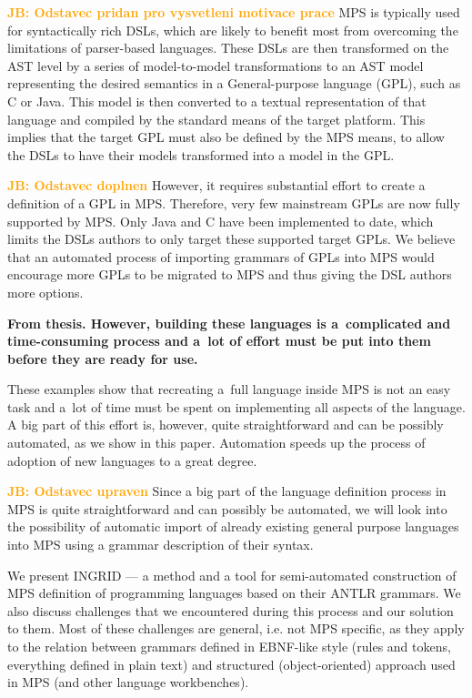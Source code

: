 \documentclass[10pt]{sigplanconf}
\newcommand{\todo}[1]{{\bfseries #1}}
\newcommand{\JB}[1]{\textcolor{orange}{\bfseries JB: #1}} %
\begin{document}
\JB{Odstavec pridan pro vysvetleni motivace prace} MPS is typically used for syntactically rich DSLs, which are likely to benefit most from overcoming the limitations of parser-based languages. These DSLs are then transformed on the AST level by a series of model-to-model transformations to an AST model representing the desired semantics in a General-purpose language (GPL), such as C or Java. This model is then converted to a textual representation of that language and compiled by the standard means of the target platform. This implies that the target GPL must also be defined by the MPS means, to allow the DSLs to have their models transformed into a model in the GPL.

\JB{Odstavec doplnen} However, it requires substantial effort to create a definition of a GPL in MPS. Therefore, very few mainstream GPLs are now fully supported by MPS. Only Java and C have been implemented to date, which limits the DSLs authors to only target these supported target GPLs. We believe that an automated process of importing grammars of GPLs into MPS would encourage more GPLs to be migrated to MPS and thus giving the DSL authors more options.

\todo{From thesis.
	However, building these languages is a~complicated and time-consuming process and a~lot of effort must be put into them before they are ready for use.

	These examples show that recreating a~full language inside MPS is not an easy task and a~lot of time must be spent on implementing all aspects of the language.
	A big part of this effort is, however, quite straightforward and can be possibly automated, as we show in this paper. Automation speeds up the process of adoption of new languages to a great degree.
}

\JB{Odstavec upraven} Since a big part of the language definition process in MPS is quite straightforward and can possibly be automated, we will look into the possibility of automatic import of already existing general purpose languages into MPS using a grammar description of their syntax.

We present INGRID --- a method and a tool for semi-automated construction of MPS definition of programming languages based on their ANTLR grammars.
We also discuss challenges that we encountered during this process and our solution to them. Most of these challenges are general, i.e. not MPS specific, as they apply to the relation between grammars defined in EBNF-like style (rules and tokens, everything defined in plain text) and structured (object-oriented) approach used in MPS (and other language workbenches).
\end{document}
